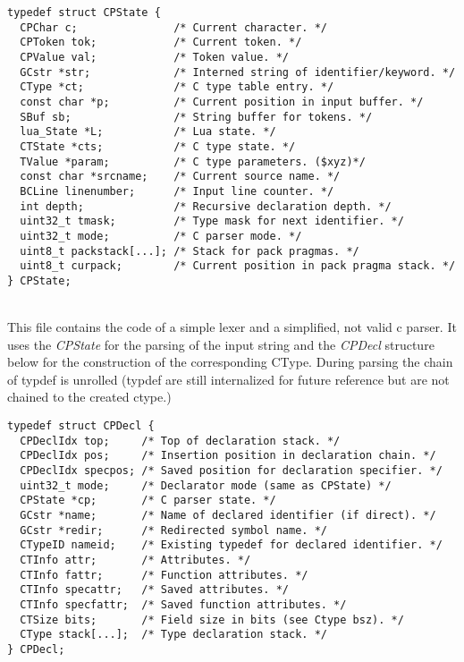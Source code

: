 \begin{adjustbox}{bgcolor=backgroundColour, max width=\textwidth}
\begin{lstlisting}[style=CStyle]
typedef struct CPState {
  CPChar c;               /* Current character. */
  CPToken tok;            /* Current token. */
  CPValue val;            /* Token value. */
  GCstr *str;             /* Interned string of identifier/keyword. */
  CType *ct;              /* C type table entry. */
  const char *p;          /* Current position in input buffer. */
  SBuf sb;                /* String buffer for tokens. */
  lua_State *L;           /* Lua state. */
  CTState *cts;           /* C type state. */
  TValue *param;          /* C type parameters. ($xyz)*/
  const char *srcname;    /* Current source name. */
  BCLine linenumber;      /* Input line counter. */
  int depth;              /* Recursive declaration depth. */
  uint32_t tmask;         /* Type mask for next identifier. */
  uint32_t mode;          /* C parser mode. */
  uint8_t packstack[...]; /* Stack for pack pragmas. */
  uint8_t curpack;        /* Current position in pack pragma stack. */
} CPState;
\end{lstlisting}
\end{adjustbox}

\\
This file contains the code of a simple lexer and a simplified, not valid c
parser. It uses the \emph{CPState} for the parsing of the input
string and the \emph{CPDecl} structure below for the construction of the
corresponding CType. During parsing the chain of typdef is unrolled (typdef are
still internalized for future reference but are not chained to the created
ctype.)

\begin{lstlisting}[style=CStyle]
typedef struct CPDecl {
  CPDeclIdx top;     /* Top of declaration stack. */
  CPDeclIdx pos;     /* Insertion position in declaration chain. */
  CPDeclIdx specpos; /* Saved position for declaration specifier. */
  uint32_t mode;     /* Declarator mode (same as CPState) */
  CPState *cp;       /* C parser state. */
  GCstr *name;       /* Name of declared identifier (if direct). */
  GCstr *redir;      /* Redirected symbol name. */
  CTypeID nameid;    /* Existing typedef for declared identifier. */
  CTInfo attr;       /* Attributes. */
  CTInfo fattr;      /* Function attributes. */
  CTInfo specattr;   /* Saved attributes. */
  CTInfo specfattr;  /* Saved function attributes. */
  CTSize bits;       /* Field size in bits (see Ctype bsz). */
  CType stack[...];  /* Type declaration stack. */
} CPDecl;
\end{lstlisting}

